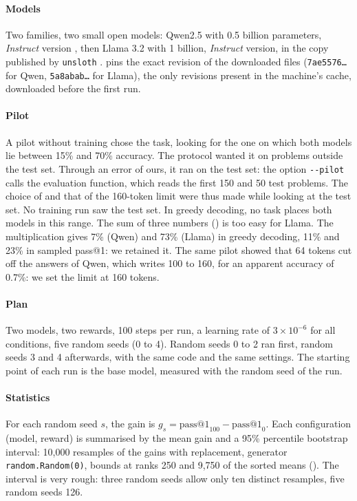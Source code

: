 \paragraph{Models} Two families, two small open models: Qwen2.5 with 0.5 billion parameters,
\emph{Instruct} version \parencite{qwen2025qwen25}, then Llama 3.2 with 1 billion, \emph{Instruct}
version, in the copy published by \texttt{unsloth} \parencite{meta2024llama32,grattafiori2024llama3}.
 pins the exact revision of the downloaded files
(\texttt{7ae5576\dots} for Qwen, \texttt{5a8abab\dots} for Llama), the only revisions present in the
machine's cache, downloaded before the first run.

\paragraph{Pilot} A pilot without training chose the task, looking for the one on which both models lie
between 15\% and 70\% accuracy. The protocol wanted it on problems outside the test set. Through an error of
ours, it ran on the test set: the option \texttt{-{}-pilot} calls the evaluation function, which
reads the first 150 and 50 test problems. The choice of  and that of the 160-token limit were
thus made while looking at the test set. No training run saw the test set. In greedy decoding, no task
places both models in this range. The sum of three numbers () is too easy for Llama. The
multiplication  gives 7\% (Qwen) and 73\% (Llama) in greedy decoding, 11\% and 23\% in
sampled pass@1: we retained it. The same pilot showed that 64 tokens cut off the answers of Qwen, which
writes 100 to 160, for an apparent accuracy of 0.7\%: we set the limit at 160 tokens.

\paragraph{Plan} Two models, two rewards, 100 steps per run, a learning rate of $3 \times 10^{-6}$
for all conditions, five random seeds (0 to 4). Random seeds 0 to 2 ran first, random seeds 3 and 4
afterwards, with the same code and the same settings. The starting point of each run is the base model,
measured with the random seed of the run.

\paragraph{Statistics} For each random seed $s$, the gain is $g_s = \text{pass@1}_{100} -
\text{pass@1}_{0}$. Each configuration (model, reward) is summarised by the mean gain and a 95\%
percentile bootstrap interval: 10,000 resamples of the gains with replacement, generator
\texttt{random.Random(0)}, bounds at ranks 250 and 9,750 of the sorted means
(). The interval is very rough: three random seeds
allow only ten distinct resamples, five random seeds 126.

